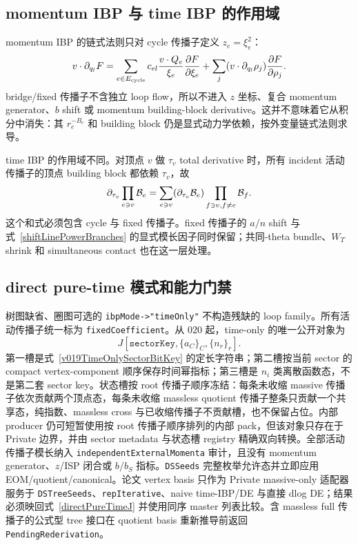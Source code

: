 ﻿\documentclass[a4paper,11pt]{article}
\begin{document}
\subsection{momentum IBP 与 time IBP 的作用域}

momentum IBP 的链式法则只对 cycle 传播子定义 $z_e=\xi_e^2$：
\begin{equation}
 v\cdot\partial_{q_l}F
 =\sum_{e\in E_{\rm cycle}}c_{el}{v\cdot Q_e\over\xi_e}
 {\partial F\over\partial\xi_e}
 +\sum_j(v\cdot\partial_{q_l}\rho_j){\partial F\over\partial\rho_j}.
 \label{cycleOnlyMomentumIBP}
\end{equation}
bridge/fixed 传播子不含独立 loop flow，所以不进入 $z$ 坐标、复合 momentum generator、$b$ shift 或 momentum building-block derivative。这并不意味着它从积分中消失：其 $r_e^{-B_e}$ 和 building block 仍是显式动力学依赖，按外变量链式法则求导。

time IBP 的作用域不同。对顶点 $v$ 做 $\tau_v$ total derivative 时，所有 incident 活动传播子的顶点 building block 都依赖 $\tau_v$，故
\begin{equation}
 \partial_{\tau_v}\prod_{e\ni v}{\cal B}_e
 =\sum_{e\ni v}(\partial_{\tau_v}{\cal B}_e)
  \prod_{f\ni v,f\ne e}{\cal B}_f.
 \label{timeIBPAllIncidentLines}
\end{equation}
这个和式必须包含 cycle 与 fixed 传播子。fixed 传播子的 $a/n$ shift 与式~\eqref{shiftLinePowerBranches} 的显式模长因子同时保留；共同-theta bundle、$W_T$ shrink 和 simultaneous contact 也在这一层处理。

\subsection{direct pure-time 模式和能力门禁}

树图缺省、圈图可选的 \texttt{ibpMode->"timeOnly"} 不构造残缺的 loop family。所有活动传播子统一标为 \texttt{fixedCoefficient}。从 020 起，time-only 的唯一公开对象为
\begin{equation}
 J[\texttt{sectorKey},\{a_C\}_C,\{n_r\}_r].
 \label{directPureTimeJ}
\end{equation}
第一槽是式~\eqref{v019TimeOnlySectorBitKey} 的定长字符串；第二槽按当前 sector 的 compact vertex-component 顺序保存时间幂指标；第三槽是 $n_i$ 类离散函数态，不是第二套 sector key。状态槽按 root 传播子顺序冻结：每条未收缩 massive 传播子依次贡献两个顶点态，每条未收缩 massless quotient 传播子整条只贡献一个共享态，纯指数、massless cross 与已收缩传播子不贡献槽，也不保留占位。内部 producer 仍可短暂使用按 root 传播子顺序排列的内部 pack，但该对象只存在于 Private 边界，并由 sector metadata 与状态槽 registry 精确双向转换。全部活动传播子模长纳入 \texttt{independentExternalMomenta} 审计，且没有 momentum generator、$z$/ISP 闭合或 $b/b_S$ 指标。\texttt{DSSeeds} 完整枚举允许态并立即应用 EOM/quotient/canonical。论文 vertex basis 只作为 Private massive-only 适配器服务于 \texttt{DSTreeSeeds}、\texttt{repIterative}、naive time-IBP/DE 与直接 dlog DE；结果必须映回式~\eqref{directPureTimeJ} 并使用同序 master 列表比较。含 massless full 传播子的公式型 tree 接口在 quotient basis 重新推导前返回 \texttt{PendingRederivation}。
\end{document}
